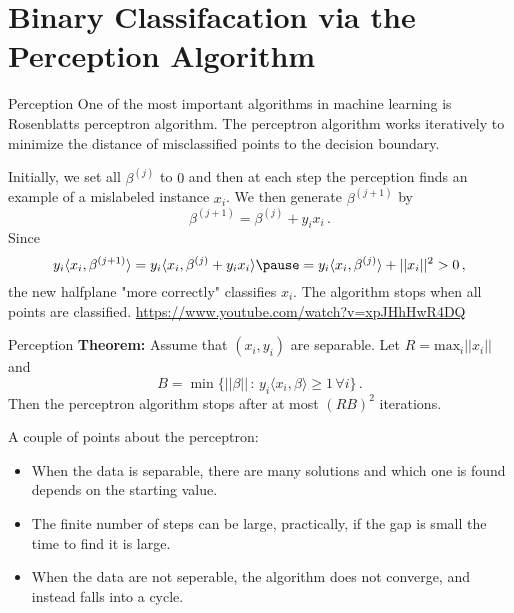\documentclass[10pt, table, dvipsnames,xcdraw, handout]{beamer}
\begin{document}
\section{Binary Classifacation via the Perception Algorithm}

\begin{frame}[fragile]{Perception}
One of the most important algorithms in machine learning is Rosenblatts perceptron algorithm. The perceptron algorithm works iteratively to minimize the distance of misclassified points to the decision boundary.\pause

Initially, we set all $\beta^{(j)}$ to $0$ and then at each step the perception finds an example of a mislabeled instance $x_i$. \pause We then generate $\beta^{(j+1)}$ by 
$$
\beta^{(j+1)} = \beta^{(j)} + y_ix_i\,.
$$ \pause
Since 
$$
y_i\langle x_i, \beta^{(j+1)}\rangle = y_i\langle x_i, \beta^{(j)} + y_ix_i \rangle \pause = y_i\langle x_i, \beta^{(j)}\rangle + ||x_i||^2>0\,,
$$
the new halfplane "more correctly" classifies $x_i$. The algorithm stops when all points are classified. 
\url{https://www.youtube.com/watch?v=xpJHhHwR4DQ}

\end{frame}


\begin{frame}[fragile]{Perception}
\textbf{Theorem:} Assume that $(x_i,y_i)$ are separable. Let $R = \text{max}_i||x_i||$ and
$$
B = \min\{||\beta||\,:\,y_i\langle  x_i,\beta\rangle\geq 1\,\forall i\}\,.
$$
Then the perceptron algorithm stops after at most $(RB)^2$ iterations. \pause

A couple of points about the perceptron:
\begin{itemize}
\item[] When the data is separable, there are many solutions and which one is found depends on the starting value. \pause
\item[] The finite number of steps can be large, practically, if the gap is small the time to find it is large. \pause
\item[] When the data are not seperable, the algorithm does not converge, and instead falls into a cycle. 
\end{itemize}
\end{frame}
\end{document}
